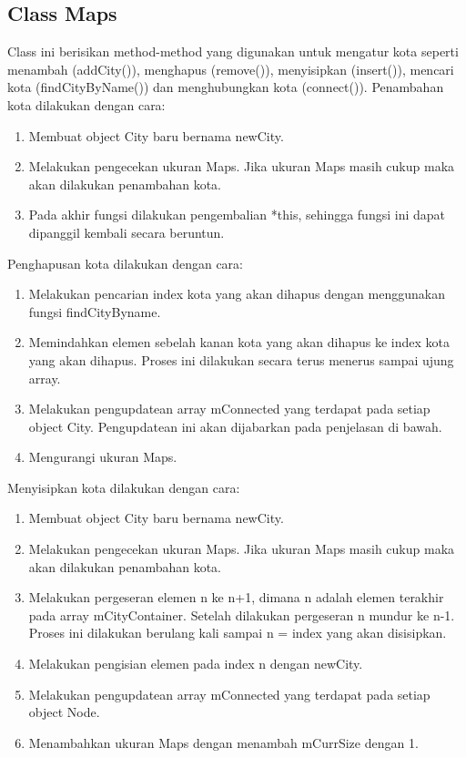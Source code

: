 \documentclass[]{article}
\begin{document}
\subsection{Class Maps}
Class ini berisikan method-method yang digunakan untuk mengatur kota seperti menambah (addCity()), menghapus (remove()), menyisipkan (insert()), mencari kota (findCityByName()) dan menghubungkan kota (connect()).
Penambahan kota dilakukan dengan cara:
\begin{enumerate}
    \item Membuat object City baru bernama newCity.
    \item Melakukan pengecekan ukuran Maps. Jika ukuran Maps masih cukup maka akan dilakukan penambahan kota.
    \item Pada akhir fungsi dilakukan pengembalian *this, sehingga fungsi ini dapat dipanggil kembali secara beruntun.
\end{enumerate}
Penghapusan kota dilakukan dengan cara:
\begin{enumerate}
    \item Melakukan pencarian index kota yang akan dihapus dengan menggunakan fungsi findCityByname.
    \item Memindahkan elemen sebelah kanan kota yang akan dihapus ke index kota yang akan dihapus. Proses ini dilakukan secara terus menerus sampai ujung array.
    \item Melakukan pengupdatean array mConnected yang terdapat pada setiap object City. Pengupdatean ini akan dijabarkan pada penjelasan di bawah.
    \item Mengurangi ukuran Maps.
\end{enumerate}
Menyisipkan kota dilakukan dengan cara:
\begin{enumerate}
    \item Membuat object City baru bernama newCity.
    \item Melakukan pengecekan ukuran Maps. Jika ukuran Maps masih cukup maka akan dilakukan penambahan kota.
    \item Melakukan pergeseran elemen n ke n+1, dimana n adalah elemen terakhir pada array mCityContainer. Setelah dilakukan pergeseran n mundur ke n-1. Proses ini dilakukan berulang kali sampai n = index yang akan disisipkan.
    \item Melakukan pengisian elemen pada index n dengan newCity.
    \item Melakukan pengupdatean array mConnected yang terdapat pada setiap object Node.
    \item Menambahkan ukuran Maps dengan menambah mCurrSize dengan 1.
\end{enumerate}
\end{document}
